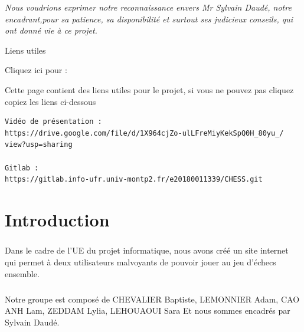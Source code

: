 \documentclass[12pt, openany]{report}
\begin{document}
\newpage
\begin{flushright}
 \textit{ Nous voudrions exprimer notre reconnaissance envers Mr Sylvain Daudé, notre      encadrant,pour sa patience, sa disponibilité et surtout ses judicieux conseils, qui ont donné vie à ce projet.}
 \end{flushright}
 
\newpage

\begin{center}
\Huge
Liens utiles   
\end{center}

\huge
Cliquez ici pour : \newline
{}
\newline
{}

\large
Cette page contient des liens utiles pour le projet, si vous ne pouvez pas cliquez copiez les liens ci-dessous

\normalsize 
\begin{verbatim}
Vidéo de présentation :
https://drive.google.com/file/d/1X964cjZo-ulLFreMiyKekSpQ0H_80yu_/
view?usp=sharing

Gitlab : 
https://gitlab.info-ufr.univ-montp2.fr/e20180011339/CHESS.git  
\end{verbatim}




\newpage
\tableofcontents

\newpage
\chapter{Introduction}

\paragraph{}
Dans le cadre de l'UE du projet informatique, nous avons créé un site internet qui permet à deux utilisateurs malvoyants de pouvoir jouer au jeu d’échecs ensemble.

\paragraph{}
Notre groupe est composé de CHEVALIER Baptiste, LEMONNIER Adam, CAO ANH Lam, ZEDDAM Lylia, LEHOUAOUI Sara
\newline
Et nous sommes encadrés par Sylvain Daudé.
\newline
\end{document}
